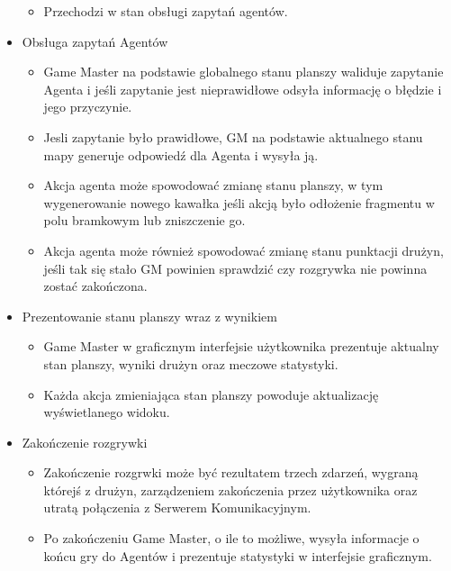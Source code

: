 \documentclass[../Dokumentacja.tex]{subfiles}
\begin{document}
\begin{itemize}
\begin{itemize}
		\item Przechodzi w stan obsługi zapytań agentów.
	\end{itemize}
	\item Obsługa zapytań Agentów
	\begin{itemize}
		\item Game Master na podstawie globalnego stanu planszy waliduje zapytanie Agenta i jeśli zapytanie jest nieprawidłowe odsyła informację o błędzie i jego przyczynie.
		\item Jesli zapytanie było prawidłowe, GM na podstawie aktualnego stanu mapy generuje odpowiedź dla Agenta i wysyła ją.
		\item Akcja agenta może spowodować zmianę stanu planszy, w tym wygenerowanie nowego kawałka jeśli akcją było odłożenie fragmentu w polu bramkowym lub zniszczenie go.
		\item Akcja agenta może również spowodować zmianę stanu punktacji drużyn, jeśli tak się stało GM powinien sprawdzić czy rozgrywka nie powinna zostać zakończona.
	\end{itemize}
	\item Prezentowanie stanu planszy wraz z wynikiem
	\begin{itemize}
		\item Game Master w graficznym interfejsie użytkownika prezentuje aktualny stan planszy, wyniki drużyn oraz meczowe statystyki.
		\item Każda akcja zmieniająca stan planszy powoduje aktualizację wyświetlanego widoku.
	\end{itemize}
	\item Zakończenie rozgrywki
	\begin{itemize}
		\item Zakończenie rozgrwki może być rezultatem trzech zdarzeń, wygraną którejś z drużyn, zarządzeniem zakończenia przez użytkownika oraz utratą połączenia z Serwerem Komunikacyjnym.
		\item Po zakończeniu Game Master, o ile to możliwe, wysyła informacje o końcu gry do Agentów i prezentuje statystyki w interfejsie graficznym.
	\end{itemize}
\end{itemize}
\end{document}
